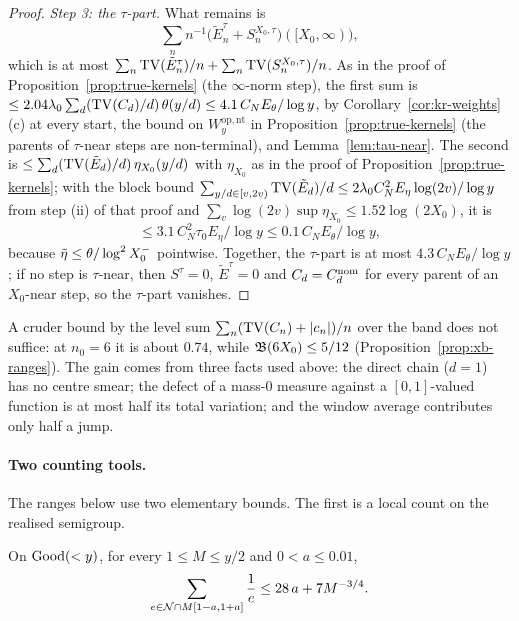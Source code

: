 \begin{proof}
\emph{Step 3: the $\tau$-part.} What remains is
\[
  \sum_n n^{-1}\bigl(\tilde E_n^\tau+S_n^{X_0,\tau}\bigr)([X_0,\infty)),
\]
which is at most $\sum_n\operatorname{TV}(\tilde E_n^\tau)/n+\sum_n\operatorname{TV}(S_n^{X_0,\tau})/n$. As in the proof of Proposition~\ref{prop:true-kernels}
(the $\infty$-norm step), the first sum is $\le2.04\lambda_0\sum_d(\operatorname{TV}(C_d)/d)\,\theta(y/d)\le4.1\,C_NE_\theta/\log y$, by
Corollary~\ref{cor:kr-weights}(c) at every start, the bound on $W^{\mathrm{op,nt}}_y$ in Proposition~\ref{prop:true-kernels}
(the parents of $\tau$-near steps are non-terminal), and Lemma~\ref{lem:tau-near}. The
second is $\le\sum_d(\operatorname{TV}(\tilde E_d)/d)\,\eta_{X_0}(y/d)$ with $\eta_{X_0}$ as in the proof of
Proposition~\ref{prop:true-kernels}; with the block bound $\sum_{y/d\in[v,2v)}\operatorname{TV}(\tilde E_d)/d\le2\lambda_0C_N^2E_\eta\log(2v)/\log y$
from step (ii) of that proof and $\sum_v\log(2v)\sup\eta_{X_0}\le1.52\log(2X_0)$, it is
\[
  \le3.1\,C_N^2\tau_0E_\eta/\log y\le0.1\,C_NE_\theta/\log y,
\]
because $\tilde\eta\le\theta/\log^2X_0^{-}$ pointwise. Together,
the $\tau$-part is at most $4.3\,C_NE_\theta/\log y$; if no step is $\tau$-near, then $S^\tau=0$, $\tilde E^\tau=0$ and
$C_d=C_d^{\mathrm{nom}}$ for every parent of an $X_0$-near step, so the $\tau$-part vanishes.
\end{proof}

\begin{remark}
A cruder bound by the level sum $\sum_{n}(\operatorname{TV}(C_n)+|c_n|)/n$ over the band does not suffice: at $n_0=6$ it is about
$0.74$, while $\mathfrak{B}(6X_0)\le5/12$ (Proposition~\ref{prop:xb-ranges}). The gain comes from three facts used above: the
direct chain ($d=1$) has no centre smear; the defect of a mass-$0$ measure against a $[0,1]$-valued function is at most
half its total variation; and the window average contributes only half a jump.
\end{remark}

\paragraph{Two counting tools.} The ranges below use two elementary bounds. The first is a local count on the realised
semigroup.

\begin{lemma}\label{lem:short-recip}
On $\mathrm{Good}(<y)$, for every $1\le M\le y/2$ and $0<a\le0.01$,
\[
  \sum_{e\in\mathcal{N}\cap M[1-a,1+a]}\frac1e\le28\,a+7M^{-3/4}.
\]
\end{lemma}

